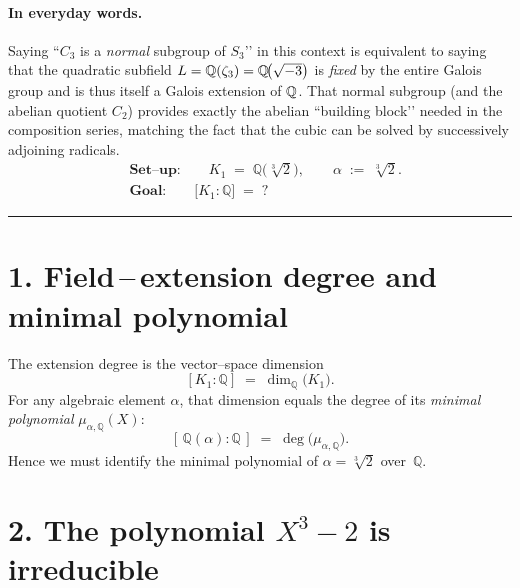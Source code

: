 \documentclass[12pt]{article}
\theoremstyle{definition} %
\theoremstyle{plain} %
\begin{document}
\paragraph{In everyday words.}
Saying “$C_3$ is a \emph{normal} subgroup of $S_3$’’ in this context is
equivalent to saying that the quadratic subfield
$L=\Bbb Q(\zeta_3)=\Bbb Q\!\bigl(\sqrt{-3}\bigr)$
is \emph{fixed} by the entire Galois group and is thus itself a Galois
extension of $\Bbb Q$.  
That normal subgroup (and the abelian quotient $C_2$) provides exactly
the abelian “building block’’ needed in the composition series, matching
the fact that the cubic can be solved by successively adjoining radicals.
\begin{align}
  &\textbf{Set--up:}\qquad 
     K_1 \;=\; \mathbb{Q}\!\bigl(\sqrt[3]{2}\bigr), 
     \qquad \alpha \;:=\; \sqrt[3]{2}.
  \\[6pt]
  &\textbf{Goal:}\qquad 
     \bigl[K_1:\mathbb{Q}\bigr] \;=\; ?
  \end{align}
  
  \bigskip
  \hrule
  \bigskip
  
  \section*{1.  Field\,–\,extension degree and minimal polynomial}
  
  The extension degree is the vector–space dimension
  \[
     [K_1:\mathbb{Q}] 
     \;=\; \dim_{\mathbb{Q}}\bigl(K_1\bigr).
  \]
  For any algebraic element $\alpha$, that dimension equals the degree of
  its \emph{minimal polynomial} $\mu_{\alpha,\mathbb{Q}}(X)$:
  \[
     [\,\mathbb{Q}(\alpha):\mathbb{Q}\,] 
     \;=\; \deg\!\bigl(\mu_{\alpha,\mathbb{Q}}\bigr).
  \]
  Hence we must identify the minimal polynomial of
  $\alpha=\sqrt[3]{2}$ over~$\mathbb{Q}$.
  
  \bigskip
  \section*{2.  The polynomial $X^{3}-2$ is irreducible}
  
\end{document}
